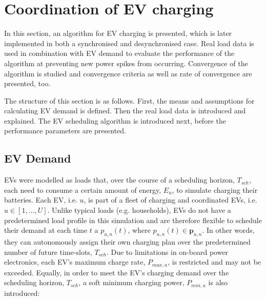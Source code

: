 \section{Coordination of EV charging}
\label{ch3:sec:ev-coordination}

In this section, an algorithm for EV charging is presented, which is later implemented in both a synchronised and desynchronised case.
Real load data is used in combination with EV demand to evaluate the performance of the algorithm at preventing new power spikes from occurring.
Convergence of the algorithm is studied and convergence criteria as well as rate of convergence are presented, too.

The structure of this section is as follows.
First, the means and assumptions for calculating EV demand is defined.
Then the real load data is introduced and explained.
The EV scheduling algorithm is introduced next, before the performance parameters are presented.

\subsection{EV Demand}



EVs were modelled as loads that, over the course of a scheduling horizon, $T_{sch}$, each need to consume a certain amount of energy, $E_u$, to simulate charging their batteries.
Each EV, i.e. $u$, is part of a fleet of charging and coordinated EVs, i.e. $u \in [1, \dots, U]$.
Unlike typical loads (e.g. households), EVs do not have a predetermined load profile in this simulation and are therefore flexible to schedule their demand at each time $t$ a $p_{u,n}(t)$, where $p_{u,n}(t) \in \textbf{p}_{u,n}$.
In other words, they can autonomously assign their own charging plan over the predetermined number of future time-slots, $T_{sch}$.
Due to limitations in on-board power electronics, each EV's maximum charge rate, $P_{max,u}$, is restricted and may not be exceeded.
Equally, in order to meet the EV's charging demand over the scheduling horizon, $T_{sch}$, a soft minimum charging power, $P_{min,u}$ is also introduced:

